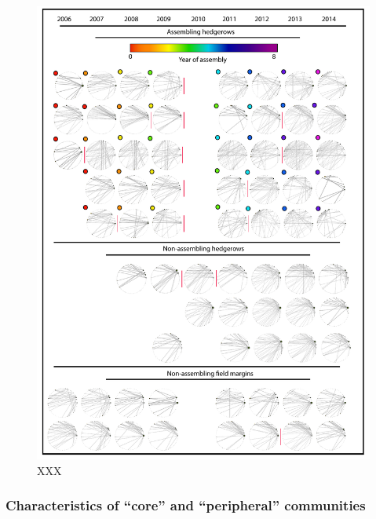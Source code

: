 \documentclass[12pt]{article}
\begin{document}
\begin{figure}
  \centering
  \includegraphics[width=.8\textwidth]{../analysis/changePoint/plotting/networks.pdf}
  \caption{XXX}
  \label{fig:changePoints}
\end{figure}
\clearpage

\subsubsection*{Characteristics of ``core'' and ``peripheral''
  communities}
\end{document}
